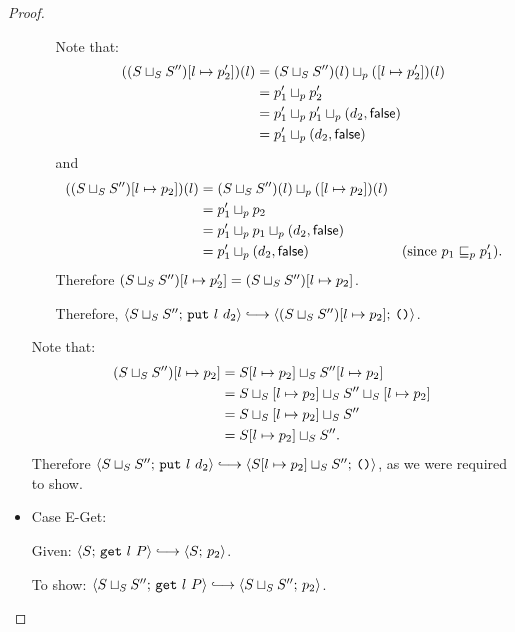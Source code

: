 \begin{proof}
\begin{itemize}
\begin{itemize}
          Note that:
          \begin{align*}
            ((S \sqcup_{S} S'')[l \mapsto p'_2])(l) &= (S \sqcup_{S} S'')(l) \sqcup_p (\left[ l \mapsto p'_2 \right])(l) \\
            &= p'_1 \sqcup_p p'_2 \\
            &= p'_1 \sqcup_p p'_1 \sqcup_p (d_2, \textsf{false}) \\
            &= p'_1 \sqcup_p (d_2, \textsf{false})
          \end{align*}
          and
          \begin{align*}
            ((S \sqcup_{S} S'')[l \mapsto p_2])(l) &= (S \sqcup_{S} S'')(l) \sqcup_p (\left[ l \mapsto p_2 \right])(l) \\
            &= p'_1 \sqcup_p p_2 \\
            &= p'_1 \sqcup_p p_1 \sqcup_p (d_2, \textsf{false}) \\
            &= p'_1 \sqcup_p (d_2, \textsf{false}) & \textrm{(since $p_1 \sqsubseteq_p p'_1$).}
          \end{align*}
          Therefore $(S \sqcup_{S} S'')[l \mapsto p'_2] =
          (S \sqcup_{S} S'')[l \mapsto p_2]$.

          Therefore, $\config{\lubstore{S}{S''}}{\putexp{l}{d_2}}
          \parstepsto
          \config{\extSRaw{(\lubstore{S}{S''})}{l}{p_2}}{\unit}$.
      \end{itemize}

      Note that:
      \begin{align*}
        (S \sqcup_{S} S'')[l \mapsto p_2] &= S[l \mapsto p_2] \sqcup_{S} S''[l \mapsto p_2] \\
        &= S \sqcup_{S} \left[ l \mapsto p_2 \right] \sqcup_{S} S'' \sqcup_{S} \left[ l \mapsto p_2 \right] \\
        &= S \sqcup_{S} \left[ l \mapsto p_2 \right] \sqcup_{S} S'' \\
        &= S[l \mapsto p_2] \sqcup_{S} S''.
      \end{align*}
      Therefore $\config{\lubstore{S}{S''}}{\putexp{l}{d_2}}
      \parstepsto \config{\lubstore{\extSRaw{S}{l}{p_2}}{S''}}{\unit}$,
      as we were required to show.

    \item Case {\sc E-Get}:

      Given: $\config{S}{\getexp{l}{P}} \parstepsto \config{S}{p_2}$.

      To show: $\config{\lubstore{S}{S''}}{\getexp{l}{P}} \parstepsto
      \config{\lubstore{S}{S''}}{p_2}$.


\end{itemize}
\end{proof}
